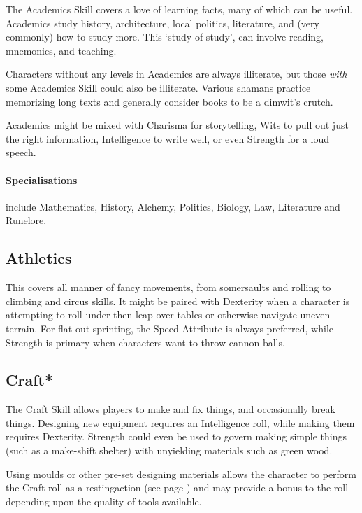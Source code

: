 \begin{multicols}{2}
The Academics Skill covers a love of learning facts, many of which can be useful.
Academics study history, architecture, local politics, literature, and (very commonly) how to study more.
This `study of study', can involve reading, mnemonics, and teaching.

Characters without any levels in Academics are always illiterate, but those \emph{with} some Academics Skill could also be illiterate.
Various shamans practice memorizing long texts and generally consider books to be a dimwit's crutch.

Academics might be mixed with Charisma for storytelling, Wits to pull out just the right information, Intelligence to write well, or even Strength for a loud speech.

\paragraph{Specialisations} include Mathematics, History, Alchemy, Politics, Biology, Law, Literature and Runelore.

\subsection{Athletics}

This covers all manner of fancy movements, from somersaults and rolling to climbing and circus skills.
It might be paired with Dexterity when a character is attempting to roll under then leap over tables or otherwise navigate uneven terrain.
For flat-out sprinting, the Speed Attribute is always preferred, while Strength is primary when characters want to throw cannon balls.

\subsection{Craft*}

The Craft Skill allows players to make and fix things, and occasionally break things.
Designing new equipment requires an Intelligence roll, while making them requires Dexterity.
Strength could even be used to govern making simple things (such as a make-shift shelter) with unyielding materials such as green wood.

Using moulds or other pre-set designing materials allows the character to perform the Craft roll as a \gls{restingaction} (see page \pageref{restingactions}) and may provide a bonus to the roll depending upon the quality of tools available.


\end{multicols}
